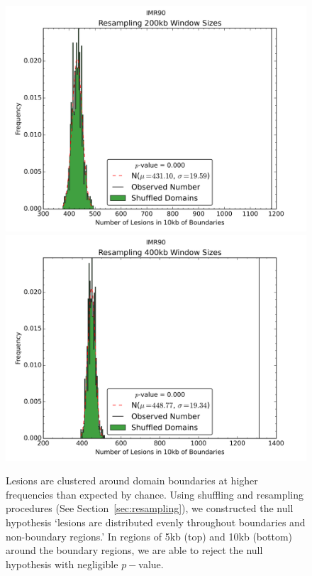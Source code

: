 \begin{figure}[H]
  \vfill

  \begin{minipage}{0.5\textwidth}%
    \includegraphics[width=\textwidth]{./figures/supplementary/domains/IMR90boundaries200kbwindows10000kbslop.png}
  \end{minipage}%
  \hfill
  \begin{minipage}{0.5\textwidth}
    \includegraphics[width=\textwidth]{./figures/supplementary/domains/IMR90boundaries400kbwindows10000kbslop.png}
  \end{minipage}
  \small
  Lesions are clustered around domain boundaries at higher frequencies than expected by chance.  Using shuffling and
  resampling procedures (See Section~\ref{sec:resampling}), we constructed the null hypothesis `lesions are distributed evenly
  throughout boundaries and non-boundary regions.'  In regions of 5kb (top) and 10kb (bottom) around the boundary regions, we are
  able to reject the null hypothesis with negligible $p-$value.
\end{figure}

